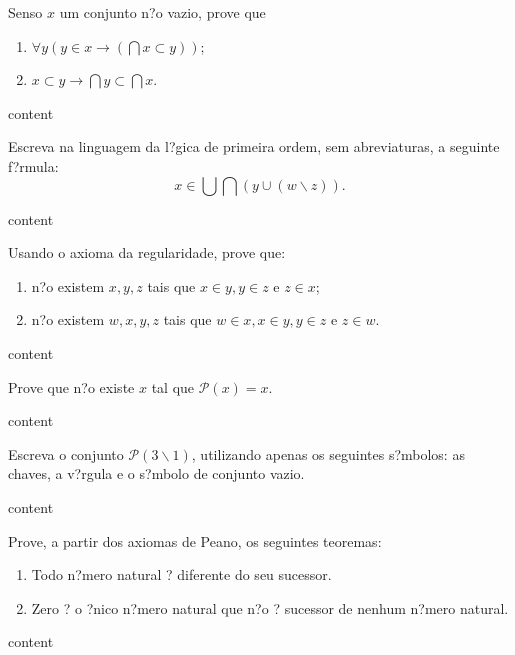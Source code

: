 \begin{exercicio}
	Senso $x$ um conjunto n?o vazio, prove que
	\begin{enumerate}[label=(\alph{*})]
		\item $\forall y(y\in x\to(\bigcap x\subset y))$;
		\item $x\subset y\to \bigcap y\subset \bigcap x$.
	\end{enumerate}
\end{exercicio}
\begin{solucao}
	content
\end{solucao}

\begin{exercicio}
	Escreva na linguagem da l?gica de primeira ordem, sem abreviaturas, a seguinte f?rmula:
	$$x\in\bigcup\bigcap(y\cup(w\backslash z)).$$
\end{exercicio}
\begin{solucao}
	content
\end{solucao}

\begin{exercicio}
	Usando o axioma da regularidade, prove que:
	\begin{enumerate}[label=(\alph{*})]
		\item n?o existem $x,y,z$ tais que $x\in y,y\in z$ e $z\in x$;
		\item n?o existem $w,x,y,z$ tais que $w\in x,x\in y,y\in z$ e $z\in w$.
	\end{enumerate}
\end{exercicio}
\begin{solucao}
	content
\end{solucao}

\begin{exercicio}
	Prove que n?o existe $x$ tal que $\mathcal{P}(x)=x$.
\end{exercicio}
\begin{solucao}
	content
\end{solucao}

\begin{exercicio}
	Escreva o conjunto $\mathcal{P}(3\backslash 1)$, utilizando apenas os seguintes s?mbolos: as chaves, a v?rgula e o s?mbolo de conjunto vazio.
\end{exercicio}
\begin{solucao}
	content
\end{solucao}

\begin{exercicio}
	Prove, a partir dos axiomas de Peano, os seguintes teoremas:
	\begin{enumerate}[label=(\alph{*})]
		\item Todo n?mero natural ? diferente do seu sucessor.
		\item Zero ? o ?nico n?mero natural que n?o ? sucessor de nenhum n?mero natural.
	\end{enumerate}
\end{exercicio}
\begin{solucao}
	content
\end{solucao}

